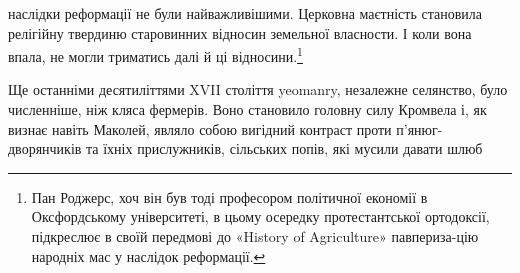 наслідки реформації не були найважливішими. Церковна
маєтність становила релігійну твердиню старовинних відносин
земельної власности. І коли вона впала, не могли триматись
далі й ці відносини.\footnote{
Пан Роджерс, хоч він був тоді професором політичної економії в
Оксфордському університеті, в цьому осередку протестантської ортодоксії,
підкреслює в своїй передмові до «History of Agriculture» павпериза-цію
народніх мас у наслідок реформації.
}

Ще останніми десятиліттями XVII століття yeomanry, незалежне
селянство, було численніше, ніж кляса фермерів. Воно
становило головну силу Кромвела і, як визнає навіть Маколей,
являло собою вигідний контраст проти п’янюг-дворянчиків та
їхніх прислужників, сільських попів, які мусили давати шлюб
\parbreak{}  %
